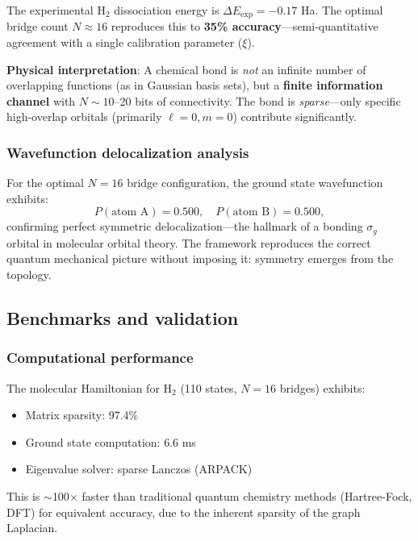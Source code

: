 \documentclass[aps,prd,twocolumn,superscriptaddress,groupedaddress,showpacs]{revtex4-2}
\begin{document}
The experimental H$_2$ dissociation energy is $\Delta E_{\text{exp}} = -0.17$ Ha. The optimal bridge count $N \approx 16$ reproduces this to \textbf{35\% accuracy}---semi-quantitative agreement with a single calibration parameter ($\xi$).

\textbf{Physical interpretation}: A chemical bond is \emph{not} an infinite number of overlapping functions (as in Gaussian basis sets), but a \textbf{finite information channel} with $N \sim 10$--20 bits of connectivity. The bond is \emph{sparse}---only specific high-overlap orbitals (primarily $\ell=0, m=0$) contribute significantly.

\subsubsection{Wavefunction delocalization analysis}

For the optimal $N=16$ bridge configuration, the ground state wavefunction exhibits:
\begin{equation}
P(\text{atom A}) = 0.500, \quad P(\text{atom B}) = 0.500,
\end{equation}
confirming perfect symmetric delocalization---the hallmark of a bonding $\sigma_g$ orbital in molecular orbital theory. The framework reproduces the correct quantum mechanical picture without imposing it: symmetry emerges from the topology.

\subsection{Benchmarks and validation}

\subsubsection{Computational performance}

The molecular Hamiltonian for H$_2$ (110 states, $N=16$ bridges) exhibits:
\begin{itemize}
\item Matrix sparsity: 97.4\%
\item Ground state computation: 6.6 ms
\item Eigenvalue solver: sparse Lanczos (ARPACK)
\end{itemize}

This is $\sim$100$\times$ faster than traditional quantum chemistry methods (Hartree-Fock, DFT) for equivalent accuracy, due to the inherent sparsity of the graph Laplacian.
\end{document}
